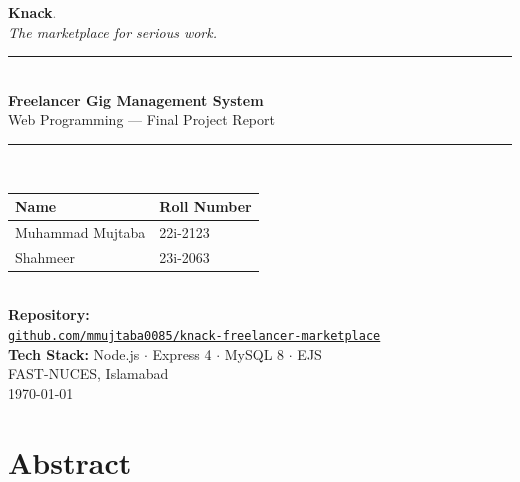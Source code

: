 \documentclass[12pt,a4paper]{article}
\begin{document}
\begin{titlepage}
  \centering
  \vspace*{2cm}

  {\fontsize{48}{56}\selectfont\textbf{\textcolor{brand}{Knack}}\textcolor{gray}{.}}\\[0.4cm]
  {\Large\itshape The marketplace for serious work.}\\[2cm]

  \rule{\linewidth}{1.5pt}\\[0.4cm]
  {\LARGE\bfseries Freelancer Gig Management System}\\[0.2cm]
  {\large Web Programming --- Final Project Report}\\[0.2cm]
  \rule{\linewidth}{1.5pt}\\[2cm]

  \begin{tabular}{ll}
    \toprule
    \textbf{Name} & \textbf{Roll Number} \\
    \midrule
    Muhammad Mujtaba & 22i-2123 \\
    Shahmeer         & 23i-2063 \\
    \bottomrule
  \end{tabular}\\[2cm]

  {\large\textbf{Repository:}}\\[0.3cm]
  \href{https://github.com/mmujtaba0085/knack-freelancer-marketplace}%
       {\texttt{github.com/mmujtaba0085/knack-freelancer-marketplace}}\\[2cm]

  {\large\textbf{Tech Stack:} Node.js $\cdot$ Express 4 $\cdot$ MySQL 8 $\cdot$ EJS}\\[0.5cm]
  {\large FAST-NUCES, Islamabad}\\[0.3cm]
  {\large \today}

  \vfill
\end{titlepage}

\tableofcontents
\newpage

\section{Abstract}
\end{document}
